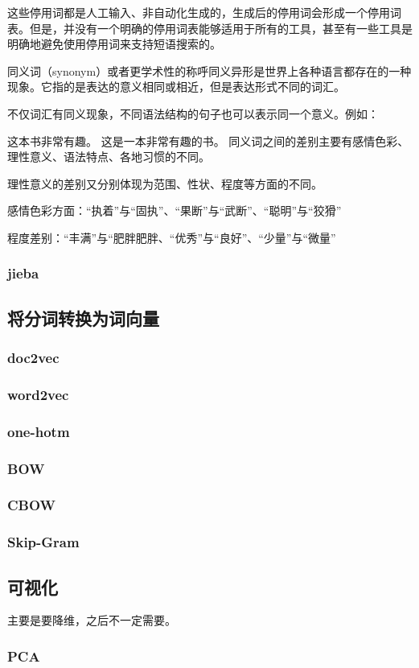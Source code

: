 \documentclass[UTF8]{ctexart}
\begin{document}
这些停用词都是人工输入、非自动化生成的，生成后的停用词会形成一个停用词表。但是，并没有一个明确的停用词表能够适用于所有的工具，甚至有一些工具是明确地避免使用停用词来支持短语搜索的。

同义词（synonym）或者更学术性的称呼同义异形是世界上各种语言都存在的一种现象。它指的是表达的意义相同或相近，但是表达形式不同的词汇。

不仅词汇有同义现象，不同语法结构的句子也可以表示同一个意义。例如：

这本书非常有趣。
这是一本非常有趣的书。
同义词之间的差别主要有感情色彩、理性意义、语法特点、各地习惯的不同。

理性意义的差别又分别体现为范围、性状、程度等方面的不同。

感情色彩方面：“执着”与“固执”、“果断”与“武断”、“聪明”与“狡猾”

程度差别：“丰满”与“肥胖肥胖、“优秀”与“良好”、“少量”与“微量”
\subsubsection{jieba}
\subsection{将分词转换为词向量}
\subsubsection{doc2vec}
\subsubsection{word2vec}
\subsubsection{one-hotm}
\subsubsection{BOW}
\subsubsection{CBOW}
\subsubsection{Skip-Gram}
\subsection{可视化}
主要是要降维，之后不一定需要。
\subsubsection{PCA}
\end{document}
